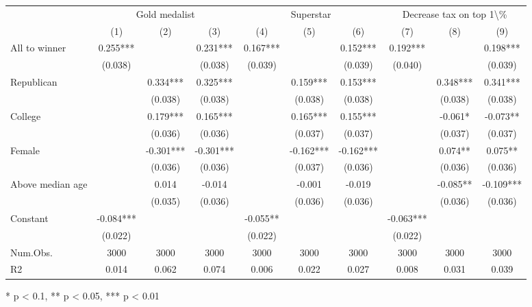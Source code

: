 \begin{table}[t]
\fontsize{12.0pt}{14.4pt}\selectfont
\begin{tabular*}{\linewidth}{@{\extracolsep{\fill}}lccccccccc}
\toprule
 & \multicolumn{3}{c}{Gold medalist} & \multicolumn{3}{c}{Superstar} & \multicolumn{3}{c}{Decrease tax on top 1\textbackslash{}\%} \\ 
\cmidrule(lr){2-4} \cmidrule(lr){5-7} \cmidrule(lr){8-10}
  & (1) & (2) & (3) & (4) & (5) & (6) & (7) & (8) & (9) \\ 
\midrule\addlinespace[2.5pt]
All to winner & 0.255*** &  & 0.231*** & 0.167*** &  & 0.152*** & 0.192*** &  & 0.198*** \\ 
 & (0.038) &  & (0.038) & (0.039) &  & (0.039) & (0.040) &  & (0.039) \\ 
Republican &  & 0.334*** & 0.325*** &  & 0.159*** & 0.153*** &  & 0.348*** & 0.341*** \\ 
 &  & (0.038) & (0.038) &  & (0.038) & (0.038) &  & (0.038) & (0.038) \\ 
College &  & 0.179*** & 0.165*** &  & 0.165*** & 0.155*** &  & -0.061* & -0.073** \\ 
 &  & (0.036) & (0.036) &  & (0.037) & (0.037) &  & (0.037) & (0.037) \\ 
Female &  & -0.301*** & -0.301*** &  & -0.162*** & -0.162*** &  & 0.074** & 0.075** \\ 
 &  & (0.036) & (0.036) &  & (0.037) & (0.036) &  & (0.036) & (0.036) \\ 
Above median age &  & 0.014 & -0.014 &  & -0.001 & -0.019 &  & -0.085** & -0.109*** \\ 
 &  & (0.035) & (0.036) &  & (0.036) & (0.036) &  & (0.036) & (0.036) \\ 
Constant & -0.084*** &  &  & -0.055** &  &  & -0.063*** &  &  \\ 
{} & {(0.022)} & {} & {} & {(0.022)} & {} & {} & {(0.022)} & {} & {} \\ 
Num.Obs. & 3000 & 3000 & 3000 & 3000 & 3000 & 3000 & 3000 & 3000 & 3000 \\ 
R2 & 0.014 & 0.062 & 0.074 & 0.006 & 0.022 & 0.027 & 0.008 & 0.031 & 0.039 \\ 
\bottomrule
\end{tabular*}
\begin{minipage}{\linewidth}
* p < 0.1, ** p < 0.05, *** p < 0.01\\
\end{minipage}
\end{table}

